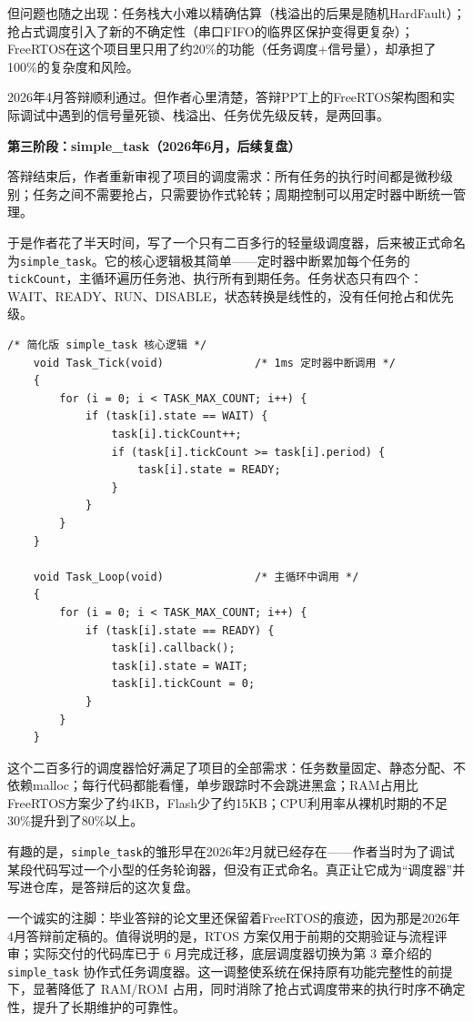 但问题也随之出现：任务栈大小难以精确估算（栈溢出的后果是随机HardFault）；抢占式调度引入了新的不确定性（串口FIFO的临界区保护变得更复杂）；FreeRTOS在这个项目里只用了约20\%的功能（任务调度+信号量），却承担了100\%的复杂度和风险。

2026年4月答辩顺利通过。但作者心里清楚，答辩PPT上的FreeRTOS架构图和实际调试中遇到的信号量死锁、栈溢出、任务优先级反转，是两回事。

\textbf{第三阶段：simple\_task（2026年6月，后续复盘）}

答辩结束后，作者重新审视了项目的调度需求：所有任务的执行时间都是微秒级别；任务之间不需要抢占，只需要协作式轮转；周期控制可以用定时器中断统一管理。

于是作者花了半天时间，写了一个只有二百多行的轻量级调度器，后来被正式命名为\texttt{simple\_task}。它的核心逻辑极其简单——定时器中断累加每个任务的\texttt{tickCount}，主循环遍历任务池、执行所有到期任务。任务状态只有四个：WAIT、READY、RUN、DISABLE，状态转换是线性的，没有任何抢占和优先级。

\begin{lstlisting}[style=c]
	/* 简化版 simple_task 核心逻辑 */
	void Task_Tick(void)              /* 1ms 定时器中断调用 */
	{
		for (i = 0; i < TASK_MAX_COUNT; i++) {
			if (task[i].state == WAIT) {
				task[i].tickCount++;
				if (task[i].tickCount >= task[i].period) {
					task[i].state = READY;
				}
			}
		}
	}
	
	void Task_Loop(void)              /* 主循环中调用 */
	{
		for (i = 0; i < TASK_MAX_COUNT; i++) {
			if (task[i].state == READY) {
				task[i].callback();
				task[i].state = WAIT;
				task[i].tickCount = 0;
			}
		}
	}
\end{lstlisting}

这个二百多行的调度器恰好满足了项目的全部需求：任务数量固定、静态分配、不依赖malloc；每行代码都能看懂，单步跟踪时不会跳进黑盒；RAM占用比FreeRTOS方案少了约4KB，Flash少了约15KB；CPU利用率从裸机时期的不足30\%提升到了80\%以上。

有趣的是，\texttt{simple\_task}的雏形早在2026年2月就已经存在——作者当时为了调试某段代码写过一个小型的任务轮询器，但没有正式命名。真正让它成为“调度器”并写进仓库，是答辩后的这次复盘。

一个诚实的注脚：毕业答辩的论文里还保留着FreeRTOS的痕迹，因为那是2026年4月答辩前定稿的。值得说明的是，RTOS 方案仅用于前期的交期验证与流程评审；实际交付的代码库已于 6 月完成迁移，底层调度器切换为第 3 章介绍的 \texttt{simple\_task} 协作式任务调度器。这一调整使系统在保持原有功能完整性的前提下，显著降低了 RAM/ROM 占用，同时消除了抢占式调度带来的执行时序不确定性，提升了长期维护的可靠性。

